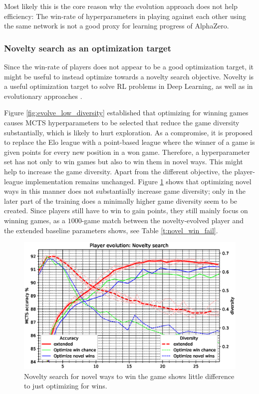 \documentclass[12pt,onecolumn,oneside,titlepage]{article}
\begin{document}
Most likely this is the core reason why the evolution approach does not help efficiency: The win-rate of hyperparameters in playing against each other using the same network is not a good proxy for learning progress of AlphaZero.


\subsubsection{Novelty search as an optimization target}

Since the win-rate of players does not appear to be a good optimization target, it might be useful to instead optimize towards a novelty search objective. 
Novelty is a useful optimization target to solve RL problems in Deep Learning, as well
as in evolutionary approaches \cite{lehman2011abandoning, jackson2019novelty}.

Figure \ref{fig:evolve_low_diversity} established that optimizing for winning games causes MCTS hyperparameters to be selected that reduce the game diversity substantially, which is likely to hurt exploration.
As a compromise, it is proposed to replace the Elo league with a point-based league where the winner of a game 
is given points for every new position in a won game. Therefore, a hyperparameter set has not only to win games but also to win them in novel ways.
This might help to increase the game diversity. 
Apart from the different objective, the player-league implementation remains unchanged. Figure \ref{fig:player_evolution_win_novelty} shows that optimizing novel ways in this manner does
not substantially increase game diversity;
only in the later part of the training does a minimally higher game diversity seem to be created. 
Since players still have to win to gain points, they still mainly focus on winning games, as a $1000$-game match between the novelty-evolved player
and the extended baseline parameters shows, see Table \ref{t:novel_win_fail}.

\begin{figure}[H]
\centering
\includegraphics[clip,width=\columnwidth]{player_evolution_win_novelty}
\caption{Novelty search for novel ways to win the game shows little difference to just optimizing for wins.}
\label{fig:player_evolution_win_novelty}
\end{figure}
\end{document}
